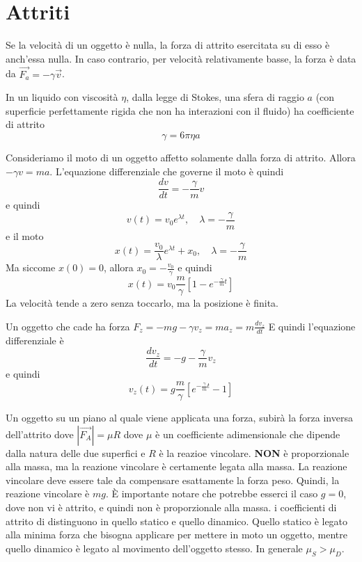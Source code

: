 \documentclass[a4paper]{article}
\begin{document}
\pagebreak

\section{Attriti}

Se la velocità di un oggetto è nulla, la forza di attrito esercitata su di esso è
anch'essa nulla.
In caso contrario, per velocità relativamente basse, 
la forza è data da \(\vec{F_a} = -\gamma\vec{v}\).

In un liquido con viscosità \(\eta\), dalla legge di Stokes,
una sfera di raggio \(a\) (con superficie perfettamente rigida che non ha
interazioni con il fluido) ha coefficiente di attrito
\[
    \gamma = 6\pi\eta a
\]

Consideriamo il moto di un oggetto affetto solamente dalla forza di attrito.
Allora \(-\gamma v = ma\). L'equazione differenziale che governe il moto è quindi
\[
    \frac{dv}{dt} = -\frac{\gamma}{m}v
\]
e quindi
\[
    v(t) = v_0e^{\lambda t}, \quad \lambda = -\frac{\gamma}{m}
\]
e il moto
\[
    x(t) = \frac{v_0}{\lambda} e^{\lambda t} + x_0, \quad \lambda = -\frac{\gamma}{m}
\]
Ma siccome \(x(0) = 0\), allora \(x_0 = - \frac{v_0}{\gamma}\)
e quindi
\[ x(t) = v_0 \frac{m}{\gamma} \left[1 - e^{-\frac{\gamma}{m}t}\right] \]
La velocità tende a zero senza toccarlo, ma la posizione è finita.

Un oggetto che cade ha forza \(F_z = -mg - \gamma v_z = ma_z = m\frac{dv_z}{dt}\)
E quindi l'equazione differenziale è
\[
    \frac{dv_z}{dt} = -g - \frac{\gamma}{m} v_z
\]
e quindi
\[
    v_z(t) = g\frac{m}{\gamma} \left[e^{-\frac{\gamma}{m}t} - 1\right]
\]

Un oggetto su un piano al quale viene applicata una forza, subirà la forza inversa
dell'attrito dove \(|\vec{F_A}| = \mu R\)
dove \(\mu\) è un coefficiente adimensionale che dipende dalla natura delle due superfici
e \(R\) è la reazioe vincolare. \textbf{NON} è proporzionale alla massa, ma la reazione vincolare
è certamente legata alla massa. La reazione vincolare deve essere tale da compensare esattamente
la forza peso. Quindi, la reazione vincolare è \(mg\). È importante notare che potrebbe
esserci il caso \(g=0\), dove non vi è attrito, e quindi non è proporzionale alla massa.
i coefficienti di attrito di distinguono in quello statico e quello dinamico.
Quello statico è legato alla minima forza che bisogna applicare per mettere in moto un oggetto,
mentre quello dinamico è legato al movimento dell'oggetto stesso.
In generale \(\mu_S > \mu_D\).
\end{document}
